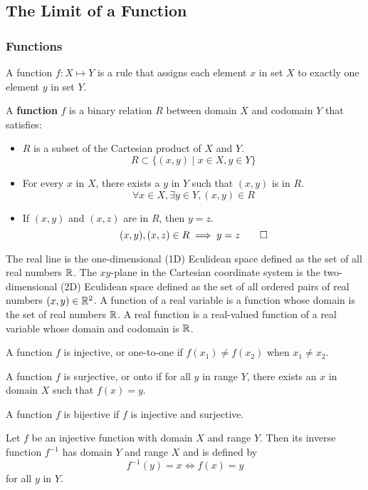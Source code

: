 \subsection{The Limit of a Function}

\subsubsection{Functions}
A function \(f:X\mapsto Y\) is a rule that assigns each element \(x\) in set
\(X\) to exactly one element \(y\) in set \(Y\).
\begin{definition}
    A \textbf{function} \(f\) is a binary relation \(R\) between domain \(X\)
    and codomain \(Y\) that satisfies:
    \begin{itemize}
        \item \(R\) is a subset of the Cartesian product of \(X\) and \(Y\).
        \[R\subset\{(x,y)\mid x\in X,y\in Y\}\]
        \item For every \(x\) in \(X\), there exists a \(y\) in \(Y\) such
        that \((x,y)\) is in \(R\).
        \[\forall x\in X,\exists y\in Y,(x,y)\in R\]
        \item If \((x,y)\) and \((x,z)\) are in \(R\), then \(y=z\).
        \[(x,y),(x,z)\in R\implies y=z\qedhere\]
    \end{itemize}
\end{definition}
The real line is the one-dimensional (1D) Eculidean space defined as the set
of all real numbers \(\mathbb{R}\).
The \(xy\)-plane in the Cartesian coordinate system is the two-dimensional
(2D) Eculidean space defined as the set of all ordered pairs of real numbers
\((x,y)\in\mathbb{R}^2\).
A function of a real variable is a function whose domain is the set of real
numbers \(\mathbb{R}\).
A real function is a real-valued function of a real variable whose domain and
codomain is \(\mathbb{R}\).
\begin{definition}
    A function \(f\) is injective, or one-to-one if \(f(x_1)\neq f(x_2)\) when
    \(x_1\neq x_2\).
\end{definition}
\begin{definition}
    A function \(f\) is surjective, or onto if for all \(y\) in range \(Y\),
    there exists an \(x\) in domain \(X\) such that \(f(x)=y\).
\end{definition}
\begin{definition}
    A function \(f\) is bijective if \(f\) is injective and surjective.
\end{definition}
\begin{definition}
    Let \(f\) be an injective function with domain \(X\) and range \(Y\).
    Then its inverse function \(f^{-1}\) has domain \(Y\) and range \(X\) and
    is defined by
    \[f^{-1}(y)=x\iff f(x)=y\]
    for all \(y\) in \(Y\).
\end{definition}

